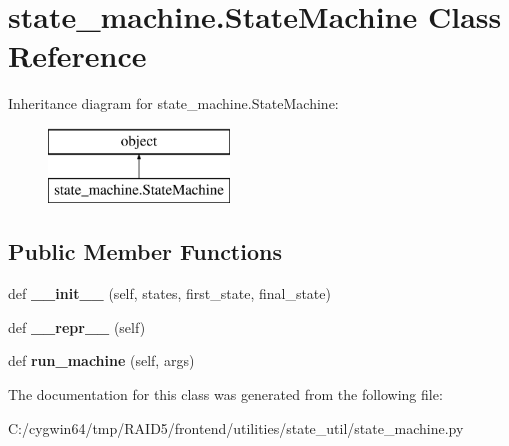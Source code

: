 \hypertarget{classstate__machine_1_1_state_machine}{}\section{state\+\_\+machine.\+State\+Machine Class Reference}
\label{classstate__machine_1_1_state_machine}
Inheritance diagram for state\+\_\+machine.\+State\+Machine\+:\begin{figure}[H]
\begin{center}
\leavevmode
\includegraphics[height=2.000000cm]{classstate__machine_1_1_state_machine}
\end{center}
\end{figure}
\subsection*{Public Member Functions}
\begin{DoxyCompactItemize}
\item 
\mbox{\label{classstate__machine_1_1_state_machine_a6dc147a96353e9cdfb91a12e0201eb79}} 
def {\bfseries \+\_\+\+\_\+init\+\_\+\+\_\+} (self, states, first\+\_\+state, final\+\_\+state)
\item 
\mbox{\label{classstate__machine_1_1_state_machine_a6ef1edf09ee6a71495679310a863c58a}} 
def {\bfseries \+\_\+\+\_\+repr\+\_\+\+\_\+} (self)
\item 
\mbox{\label{classstate__machine_1_1_state_machine_a94a78f44136fa4ed13a02b29d148a095}} 
def {\bfseries run\+\_\+machine} (self, args)
\end{DoxyCompactItemize}


The documentation for this class was generated from the following file\+:\begin{DoxyCompactItemize}
\item 
C\+:/cygwin64/tmp/\+R\+A\+I\+D5/frontend/utilities/state\+\_\+util/state\+\_\+machine.\+py\end{DoxyCompactItemize}
